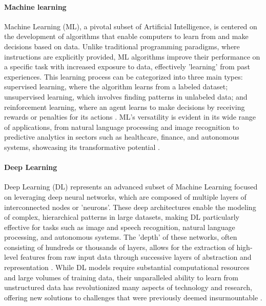\documentclass{article}
\begin{document}
\paragraph{Machine learning}
Machine Learning (ML), a pivotal subset of Artificial Intelligence, is centered on the development of algorithms that enable computers to learn from and make decisions based on data. Unlike traditional programming paradigms, where instructions are explicitly provided, ML algorithms improve their performance on a specific task with increased exposure to data, effectively 'learning' from past experiences. This learning process can be categorized into three main types: supervised learning, where the algorithm learns from a labeled dataset; unsupervised learning, which involves finding patterns in unlabeled data; and reinforcement learning, where an agent learns to make decisions by receiving rewards or penalties for its actions \cite{Bishop2006}. ML's versatility is evident in its wide range of applications, from natural language processing and image recognition to predictive analytics in sectors such as healthcare, finance, and autonomous systems, showcasing its transformative potential \cite{JordanMitchell2015}.

\paragraph{Deep Learning}
Deep Learning (DL) represents an advanced subset of Machine Learning focused on leveraging deep neural networks, which are composed of multiple layers of interconnected nodes or 'neurons'. These deep architectures enable the modeling of complex, hierarchical patterns in large datasets, making DL particularly effective for tasks such as image and speech recognition, natural language processing, and autonomous systems. The 'depth' of these networks, often consisting of hundreds or thousands of layers, allows for the extraction of high-level features from raw input data through successive layers of abstraction and representation \cite{LeCunBengioHinton2015}. While DL models require substantial computational resources and large volumes of training data, their unparalleled ability to learn from unstructured data has revolutionized many aspects of technology and research, offering new solutions to challenges that were previously deemed insurmountable \cite{GoodfellowBengioCourville2016}.
\end{document}
